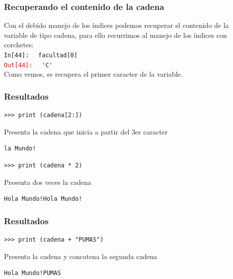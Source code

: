 {\begin{frame}
\end{frame}
\begin{frame}[fragile]
\frametitle{Recuperando el contenido de la cadena}
Con el debido manejo de los índices podemos recuperar el contenido de la variable de tipo cadena, para ello recurrimos al manejo de los índices con corchetes:
\\
\bigskip
\pause
\textcolor{ao}{\texttt{In[44]: }} \verb| facultad[0]|
\\
\pause
\textcolor{red}{\texttt{Out[44]: }} \verb| 'C'|
\\
\medskip
Como vemos, se recupera el primer caracter de la variable.
\end{frame}
\begin{frame}[fragile]
\frametitle{Resultados}
\begin{verbatim}
>>> print (cadena[2:])
\end{verbatim}
\pause
Presenta la cadena que inicia a partir del 3er caracter
\begin{verbatim}
la Mundo!
\end{verbatim}
\pause
\begin{verbatim}
>>> print (cadena * 2)
\end{verbatim}
\pause
Presenta dos veces la cadena
\begin{verbatim}
Hola Mundo!Hola Mundo!
\end{verbatim}
\end{frame}
\begin{frame}[fragile]
\frametitle{Resultados}
\begin{verbatim}
>>> print (cadena + "PUMAS")
\end{verbatim}
\pause
Presenta la cadena y concatena la segunda cadena
\begin{verbatim}
Hola Mundo!PUMAS
\end{verbatim}
\end{frame}
}
